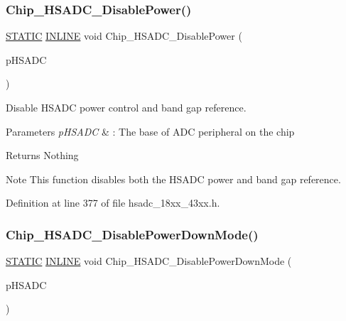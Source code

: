 \subsubsection{\texorpdfstring{Chip\+\_\+\+H\+S\+A\+D\+C\+\_\+\+Disable\+Power()}{Chip\_HSADC\_DisablePower()}}
{\footnotesize\ttfamily \hyperlink{group___l_p_c___types___public___macros_ga10b2d890d871e1489bb02b7e70d9bdfb}{S\+T\+A\+T\+IC} \hyperlink{spifi__18xx__43xx_8h_a2eb6f9e0395b47b8d5e3eeae4fe0c116}{I\+N\+L\+I\+NE} void Chip\+\_\+\+H\+S\+A\+D\+C\+\_\+\+Disable\+Power (\begin{DoxyParamCaption}\item[{\hyperlink{struct_l_p_c___h_s_a_d_c___t}{L\+P\+C\+\_\+\+H\+S\+A\+D\+C\+\_\+T} $\ast$}]{p\+H\+S\+A\+DC }\end{DoxyParamCaption})}



Disable H\+S\+A\+DC power control and band gap reference. 


\begin{DoxyParams}{Parameters}
{\em p\+H\+S\+A\+DC} & \+: The base of A\+DC peripheral on the chip \\
\hline
\end{DoxyParams}
\begin{DoxyReturn}{Returns}
Nothing 
\end{DoxyReturn}
\begin{DoxyNote}{Note}
This function disables both the H\+S\+A\+DC power and band gap reference. 
\end{DoxyNote}


Definition at line 377 of file hsadc\+\_\+18xx\+\_\+43xx.\+h.

\mbox{\label{group___h_s_a_d_c__18_x_x__43_x_x_ga84152d56e357d1b892d32aaa7b88621e}} 
\subsubsection{\texorpdfstring{Chip\+\_\+\+H\+S\+A\+D\+C\+\_\+\+Disable\+Power\+Down\+Mode()}{Chip\_HSADC\_DisablePowerDownMode()}}
{\footnotesize\ttfamily \hyperlink{group___l_p_c___types___public___macros_ga10b2d890d871e1489bb02b7e70d9bdfb}{S\+T\+A\+T\+IC} \hyperlink{spifi__18xx__43xx_8h_a2eb6f9e0395b47b8d5e3eeae4fe0c116}{I\+N\+L\+I\+NE} void Chip\+\_\+\+H\+S\+A\+D\+C\+\_\+\+Disable\+Power\+Down\+Mode (\begin{DoxyParamCaption}\item[{\hyperlink{struct_l_p_c___h_s_a_d_c___t}{L\+P\+C\+\_\+\+H\+S\+A\+D\+C\+\_\+T} $\ast$}]{p\+H\+S\+A\+DC }\end{DoxyParamCaption})}



